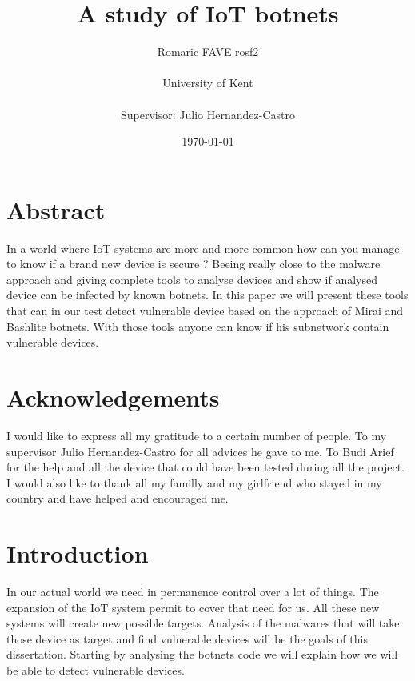\documentclass{report}
\date{\monthyeardate\today}
\begin{document}
\title{A study of IoT botnets}
\author{Romaric FAVE rosf2\\
  \\
  University of Kent\\
  \\
  Supervisor: Julio Hernandez-Castro
}

\maketitle


\tableofcontents

\chapter*{Abstract}
In a world where IoT systems are more and more common how can you manage to know if a brand new device is secure ? Beeing really close to the malware approach and giving complete tools to analyse devices and show if analysed device can be infected by known botnets. In this paper we will present these tools that can in our test detect vulnerable device based on the approach of Mirai and Bashlite botnets. With those tools anyone can know if his subnetwork contain vulnerable devices.

\chapter*{Acknowledgements}
I would like to express all my gratitude to a certain number of people.\newline
To my supervisor Julio Hernandez-Castro for all advices he gave to me.\newline
To Budi Arief for the help and all the device that could have been tested during all the project.\newline
I would also like to thank all my familly and my girlfriend who stayed in my country and have helped and encouraged me.

\chapter{Introduction}
In our actual world we need in permanence control over a lot of things. The expansion of the IoT system permit to cover that need for us. All these new systems will create new possible targets. Analysis of the malwares that will take those device as target and find vulnerable devices will be the goals of this dissertation.\newline
Starting by analysing the botnets code we will explain how we will be able to detect vulnerable devices.
\end{document}
